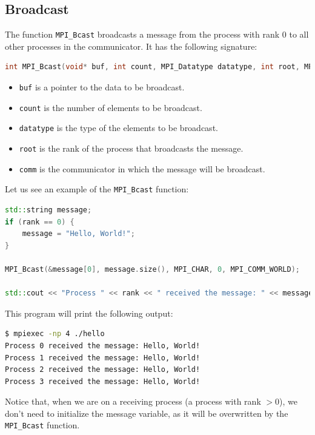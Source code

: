 \subsection{Broadcast}

The function \texttt{MPI\_Bcast} broadcasts a message from the process with rank 0 to all other
processes in the communicator. It has the following signature:

\begin{lstlisting}[language=C++]
int MPI_Bcast(void* buf, int count, MPI_Datatype datatype, int root, MPI_Comm comm);
\end{lstlisting}

\begin{itemize}
    \item \texttt{buf} is a pointer to the data to be broadcast.
    \item \texttt{count} is the number of elements to be broadcast.
    \item \texttt{datatype} is the type of the elements to be broadcast.
    \item \texttt{root} is the rank of the process that broadcasts the message.
    \item \texttt{comm} is the communicator in which the message will be broadcast.
\end{itemize}

Let us see an example of the \texttt{MPI\_Bcast} function:

\begin{lstlisting}[language=C++]
std::string message;
if (rank == 0) {
    message = "Hello, World!";
}

MPI_Bcast(&message[0], message.size(), MPI_CHAR, 0, MPI_COMM_WORLD);

std::cout << "Process " << rank << " received the message: " << message << std::endl;
\end{lstlisting}

\vspace{1em}

This program will print the following output:

\begin{lstlisting}[language=bash]
$ mpiexec -np 4 ./hello
Process 0 received the message: Hello, World!
Process 1 received the message: Hello, World!
Process 2 received the message: Hello, World!
Process 3 received the message: Hello, World!
\end{lstlisting}

Notice that, when we are on a receiving process (a process with rank $> 0$), we don't need 
to initialize the message variable, as it will be overwritten by the \texttt{MPI\_Bcast} 
function.

